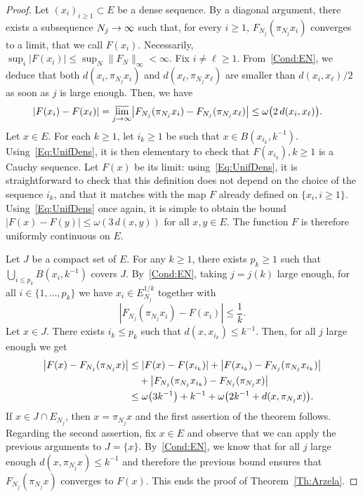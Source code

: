\documentclass[10pt]{amsart}
\theoremstyle{definition}\newtheorem{defi}[theo]{Definition}\newtheorem{rema}[theo]{Remark}\newtheorem{exam}[theo]{Example}\newtheorem{exem}[theo]{Example}\newtheorem{nota}[theo]{Notation}
\theoremstyle{plain}
\let\originalleft\left
\let\originalright\right
\renewcommand{\left}{\mathopen{}\mathclose\bgroup\originalleft}
\renewcommand{\right}{\aftergroup\egroup\originalright}
\renewcommand*{\to}{\mathchoice{\longrightarrow}{\rightarrow}{\rightarrow}{\rightarrow}}
\begin{document}
\begin{proof}
Let $(x_i)_{i\geq 1} \subset E$ be a dense sequence. By a diagonal argument, there exists a subsequence $N_j \to\infty$ such that, for every $i\geq 1$, $F_{N_j}(\pi_{N_j} x_i)$ converges to a limit, that we call $F(x_i)$. Necessarily, $\sup_i |F(x_i)| \leq \sup_N \|F_N\|_{\infty}<\infty$. Fix $i\ne \ell \geq 1$. From~\eqref{Cond:EN}, we deduce that both $d(x_i,\pi_{N_j} x_i)$ and $d(x_\ell,\pi_{N_j} x_\ell)$ are smaller than $d(x_i,x_\ell)/2$ as soon as $j$ is large enough. Then, we have
\begin{equation}\label{Eq:UnifDens}
|F(x_i) - F(x_\ell)| = \varlimsup_{j\to\infty} \left|F_{N_j}(\pi_{N_j} x_i) - F_{N_j}(\pi_{N_j} x_\ell)\right|\leq \omega\bigl(2\, d(x_i,x_{\ell})\bigr).\quad
\end{equation}
Let $x\in E$. For each $k\geq 1$, let $i_k\geq 1$ be such that $x \in B(x_{i_k},k^{-1})$. Using~\eqref{Eq:UnifDens}, it is then elementary to check that $F(x_{i_k}),k\geq 1$ is a Cauchy sequence. Let $F(x)$ be its limit: using~\eqref{Eq:UnifDens}, it is straightforward to check that this definition does not depend on the choice of the sequence $i_k$, and that it matches with the map $F$ already defined on $\{x_i, i\ge 1\}$. Using~\eqref{Eq:UnifDens} once again, it is simple to obtain the bound $|F(x)-F(y)| \leq \omega(3\,d(x,y))$ for all $x,y\in E$. The function $F$ is therefore uniformly continuous on $E$.

Let $J$ be a compact set of $E$. For any $k\geq 1$, there exists $p_k\geq 1$ such that $\bigcup_{i\leq p_k} B(x_{i},k^{-1})$ covers $J$. By~\eqref{Cond:EN}, taking $j=j(k)$ large enough, for all $i\in\{1,\dots,p_k\}$ we have $x_i \in E_{N_j}^{1/k}$ together with
\begin{equation}
|F_{N_j}(\pi_{N_j} x_{i})-F(x_{i})| \leq \frac{1}{k} .
\end{equation}
Let $x\in J$. There exists $i_k \leq p_k$ such that $d(x,x_{i_k})\leq k^{-1}$. Then, for all $j$ large enough we get
\begin{align*}
\left|F(x)-F_{N_j}(\pi_{N_j} x)\right| &\leq |F(x)-F(x_{i_k})| + \left|F(x_{i_k})-F_{N_j}(\pi_{N_j} x_{i_k})\right|\\
&\quad+ \left|F_{N_j}(\pi_{N_j} x_{i_k})-F_{N_j}(\pi_{N_j} x)\right|\\
&\leq \omega\left(3 k^{-1}\right) + k^{-1} + \omega\left(2k^{-1}+d(x,\pi_{N_j} x)\right ).
\end{align*}
If $x\in J\cap E_{N_j}$, then $x=\pi_{N_j} x$ and the first assertion of the theorem follows. Regarding the second assertion, fix $x\in E$ and observe that we can apply the previous arguments to $J=\{x\}$. By~\eqref{Cond:EN}, we know that for all $j$ large enough $d(x,\pi_{N_j} x)\le k^{-1}$ and therefore the previous bound ensures that $F_{N_j}(\pi_{N_j} x)$ converges to $F(x)$. This ends the proof of Theorem~\ref{Th:Arzela}.
\end{proof}
\end{document}
